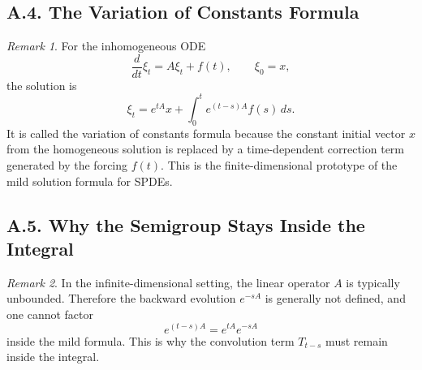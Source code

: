 \documentclass[11pt]{article}
\theoremstyle{definition}
\theoremstyle{remark}
\newtheorem{remark}{Remark}
\begin{document}
\subsection*{A.4. The Variation of Constants Formula}
\begin{remark}
For the inhomogeneous ODE
\[
\frac{d}{dt}\xi_t=A\xi_t+f(t),
\qquad
\xi_0=x,
\]
the solution is
\[
\xi_t=e^{tA}x+\int_0^t e^{(t-s)A}f(s)\,ds.
\]
It is called the variation of constants formula because the constant initial vector \(x\) from the homogeneous solution is replaced by a time-dependent correction term generated by the forcing \(f(t)\).
This is the finite-dimensional prototype of the mild solution formula for SPDEs.
\end{remark}

\subsection*{A.5. Why the Semigroup Stays Inside the Integral}
\begin{remark}
In the infinite-dimensional setting, the linear operator \(A\) is typically unbounded. Therefore the backward evolution \(e^{-sA}\) is generally not defined, and one cannot factor
\[
e^{(t-s)A}=e^{tA}e^{-sA}
\]
inside the mild formula. This is why the convolution term \(T_{t-s}\) must remain inside the integral.
\end{remark}
\end{document}
